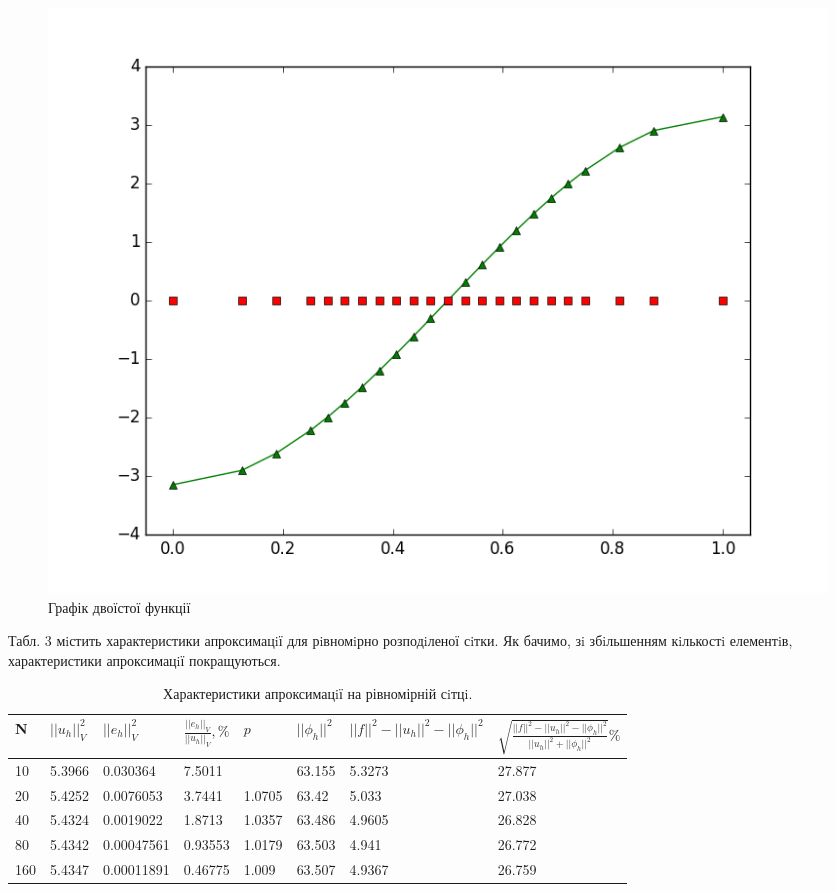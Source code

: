\documentclass[a4paper]{article}
\numberwithin{equation}{section}
\begin{document}
\begin{figure}[H]
\includegraphics[width=\textwidth]{figure_6.png}
\caption{Графік двоїстої функції}
\end{figure}

Табл. 3 мiстить характеристики апроксимацiї для рiвномiрно розподiленої сiтки. Як бачимо, зi збiльшенням кiлькостi елементiв, характеристики апроксимацiї покращуються.

\begin{table}[H]
\centering
\begin{tabular}{|l|l|l|l|l|l|l|l|}
\hline
N   & $ ||u_h||_V^2 $ & $ ||e_h||_V^2 $ & $ \frac{||e_h||_V}{||u_h||_V}, \% $ & $ p $ & $ ||\phi_h||^2 $ & $ ||f||^2 - ||u_h||^2 - ||\phi_h||^2 $ & $ \sqrt{\frac{||f||^2 - ||u_h||^2 - ||\phi_h||^2}{||u_h||^2 + ||\phi_h||^2}} \% $ \\ \hline
10 & 5.3966 & 0.030364 & 7.5011 &  & 63.155 & 5.3273 & 27.877 \\ \hline
20 & 5.4252 & 0.0076053 & 3.7441 & 1.0705 & 63.42 & 5.033 & 27.038 \\ \hline
40 & 5.4324 & 0.0019022 & 1.8713 & 1.0357 & 63.486 & 4.9605 & 26.828 \\ \hline
80 & 5.4342 & 0.00047561 & 0.93553 & 1.0179 & 63.503 & 4.941 & 26.772 \\ \hline
160 & 5.4347 & 0.00011891 & 0.46775 & 1.009 & 63.507 & 4.9367 & 26.759 \\ \hline

\end{tabular}
\caption{Характеристики апроксимацiї на рівномірній сiтцi.}
\end{table}
\end{document}
